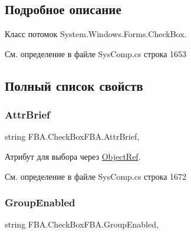\subsection{Подробное описание}
Класс потомок System.\+Windows.\+Forms.\+Check\+Box. 



См. определение в файле Sys\+Comp.\+cs строка 1653



\subsection{Полный список свойств}
\mbox{\label{class_f_b_a_1_1_check_box_f_b_a_a60fa8d7ec56d0b053ae45dcd455aba15}} 
\subsubsection{\texorpdfstring{Attr\+Brief}{AttrBrief}}
{\footnotesize\ttfamily string F\+B\+A.\+Check\+Box\+F\+B\+A.\+Attr\+Brief\hspace{0.3cm}{\ttfamily [get]}, {\ttfamily [set]}}



Атрибут для выбора через \mbox{\hyperlink{class_f_b_a_1_1_object_ref}{Object\+Ref}}. ~\newline




См. определение в файле Sys\+Comp.\+cs строка 1672

\mbox{\label{class_f_b_a_1_1_check_box_f_b_a_a0f39ae777871622eeb343f4585c4bd13}} 
\subsubsection{\texorpdfstring{Group\+Enabled}{GroupEnabled}}
{\footnotesize\ttfamily string F\+B\+A.\+Check\+Box\+F\+B\+A.\+Group\+Enabled\hspace{0.3cm}{\ttfamily [get]}, {\ttfamily [set]}}



